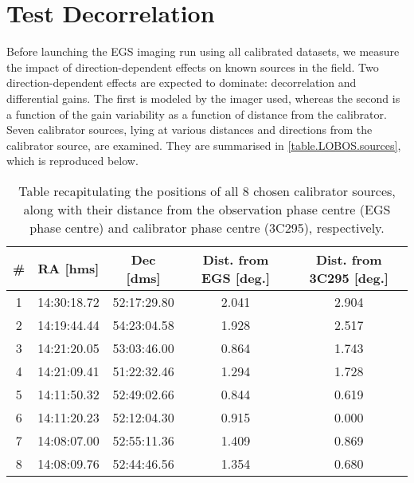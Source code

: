 \section{Test Decorrelation}
\pg
Before launching the EGS imaging run using all calibrated datasets, we measure the impact of direction-dependent effects on known sources in the field. Two direction-dependent effects are expected to dominate: decorrelation and differential gains. The first is modeled by the imager used, whereas the second is a function of the gain variability as a function of distance from the calibrator. Seven calibrator sources, lying at various distances and directions from the calibrator source, are examined. They are summarised in \cref{table.LOBOS.sources}, which is reproduced below.

\begin{table}[h!]
\begin{tabular}{ccccc}
\# & RA [hms]    & Dec [dms]   & Dist. from EGS [deg.] & Dist. from 3C295 [deg.] \\\hline
1  & 14:30:18.72 & 52:17:29.80 & 2.041                         & 2.904 \\
2  & 14:19:44.44 & 54:23:04.58 & 1.928                         & 2.517 \\ 
3  & 14:21:20.05 & 53:03:46.00 & 0.864                         & 1.743 \\
4  & 14:21:09.41 & 51:22:32.46 & 1.294                         & 1.728 \\
5  & 14:11:50.32 & 52:49:02.66 & 0.844                         & 0.619 \\
6  & 14:11:20.23 & 52:12:04.30 & 0.915                         & 0.000 \\
7  & 14:08:07.00 & 52:55:11.36 & 1.409                         & 0.869 \\
8  & 14:08:09.76 & 52:44:46.56 & 1.354                         & 0.680 \\
\end{tabular}
\caption{\label{table.LOBOS.sources1}Table recapitulating the positions of all 8 chosen calibrator sources, along with their distance from the observation phase centre (EGS phase centre) and calibrator phase centre (3C295), respectively.}
\end{table}

